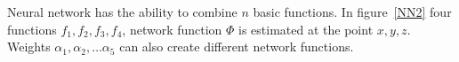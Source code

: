 \begin{figure}
\centering
{}
\end{figure}


Neural network has the ability to combine $n$ basic functions. In figure~\ref{NN2} four functions $f_1,  f_2, f_3, f_4$, network function  $ \Phi $  is estimated at the point $x, y, z$. Weights $ \alpha_1, \alpha_2,… \alpha_5 $ can also create different network functions.





\begin{figure}
\centering
{}
\end{figure}

